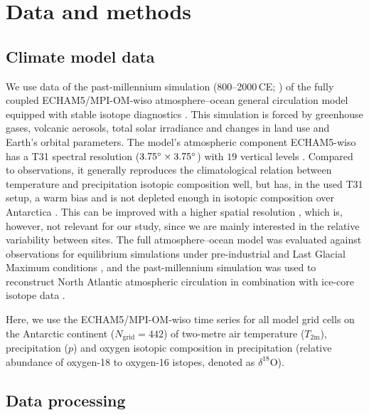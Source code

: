 \documentclass[cp, manuscript, draft]{copernicus}
\begin{document}
\section{Data and methods}\label{methods}

\subsection{Climate model data}\label{methods:data}

We use data of the past-millennium simulation (800--2000\,CE;
\citealp{Sjolte2018}) of the fully coupled ECHAM5/MPI-OM-wiso atmosphere--ocean
general circulation model equipped with stable isotope diagnostics
\citep{Werner2016}. This simulation is forced by greenhouse gases, volcanic
aerosols, total solar irradiance and changes in land use and Earth's orbital
parameters. The model's atmospheric component ECHAM5-wiso has a T31 spectral
resolution ($3.75^{\circ}\times3.75^{\circ}$) with $19$ vertical levels
\citep{Sjolte2018}. Compared to observations, it generally reproduces the
climatological relation between temperature and precipitation isotopic
composition well, but has, in the used T31 setup, a warm bias and is not
depleted enough in isotopic composition over Antarctica \citep{Werner2011}. This
can be improved with a higher spatial resolution \citep{Werner2011}, which is,
however, not relevant for our study, since we are mainly interested in the
relative variability between sites. The full atmosphere--ocean model was
evaluated against observations for equilibrium simulations under pre-industrial
and Last Glacial Maximum conditions \citep{Werner2016}, and the past-millennium
simulation was used to reconstruct North Atlantic atmospheric circulation in
combination with ice-core isotope data \citep{Sjolte2018}.

Here, we use the ECHAM5/MPI-OM-wiso time series for all model grid cells
on the Antarctic continent ($N_{\mathrm{grid}}=442$) of two-metre air
temperature ($T_{2\mathrm{m}}$), precipitation ($p$) and oxygen isotopic
composition in precipitation (relative abundance of oxygen-18 to oxygen-16
istopes, denoted as $\delta^{18}\mathrm{O}$).

\subsection{Data processing}\label{methods:prc}
\end{document}
